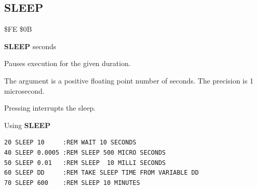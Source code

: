 
\newpage
\subsection{SLEEP}
\begin{description}[leftmargin=2cm,style=nextline]
\item [Token:] \$FE \$0B
\item [Format:] {\bf SLEEP} seconds
\item [Usage:] Pauses execution for the given duration.

               The argument is a
               positive floating point number of seconds.
               The precision is 1 microsecond.
\item [Remarks:] Pressing  interrupts the sleep.

\item [Example:] Using {\bf SLEEP}
\begin{tcolorbox}[colback=black,coltext=white]
\verbatimfont{\codefont}
\begin{verbatim}
20 SLEEP 10     :REM WAIT 10 SECONDS
40 SLEEP 0.0005 :REM SLEEP 500 MICRO SECONDS
50 SLEEP 0.01   :REM SLEEP  10 MILLI SECONDS
60 SLEEP DD     :REM TAKE SLEEP TIME FROM VARIABLE DD
70 SLEEP 600    :REM SLEEP 10 MINUTES
\end{verbatim}
\end{tcolorbox}
\end{description}


\newpage
